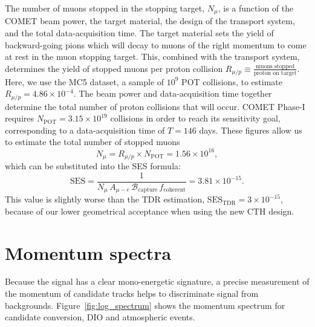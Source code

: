 The number of muons stopped in the stopping target, $N_\mu$, is a function of
the COMET beam power, the target material, the design of the
transport system, and the total data-acquisition time. 
The target material sets the yield of
backward-going pions which will decay to muons of the right momentum to come at
rest in the muon stopping target. This, combined with the transport system,
determines the yield of stopped muons per proton collision $R_{\mu/p} \equiv
\frac{\text{muons stopped}}{\text{proton on target}}$. Here, we use the
MC5 dataset, a sample of $10^9$ POT collisions, to estimate $R_{\mu/p}=4.86
\times 10^{-4}$.
The beam power and data-acquisition time together determine the total number of proton
collisions that will occur. COMET Phase-I requires $N_\mathrm{POT} = 3.15 \times
10^{19}$ collisions in order to reach its sensitivity goal, corresponding to a
data-acquisition time of $T=146$ days.
These figures allow us to estimate the total number of stopped muons
$$N_\mu = R_{\mu/p} \times N_\mathrm{POT} = 1.56\times 10^{16},$$
which can be substituted into the SES formula:
\begin{equation}\label{eq:my_ses}
\mathrm{SES}
=\frac{1}{N_\mu\,A_{\mu-e}\,\mathcal{B}_\mathrm{capture}\,f_\mathrm{coherent}}
= 3.81\times10^{-15}.
\end{equation}
This value is slightly worse than the TDR estimation,
$\mathrm{SES}_\mathrm{TDR}=3\times 10^{-15}$, because of our lower geometrical
acceptance when using the new CTH design.




\section{Momentum spectra}
Because the signal has a clear mono-energetic signature, a precise measurement
of the momentum of candidate tracks helps to discriminate signal from
backgrounds. Figure~\ref{fig:log_spectrum} shows the momentum spectrum
for candidate conversion, DIO and atmospheric events.

